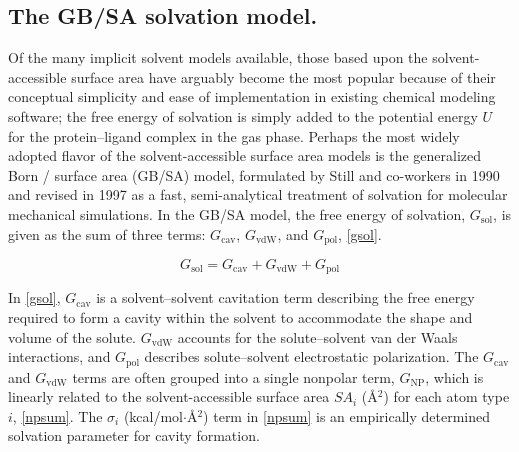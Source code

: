 \documentclass[12pt]{report}
\begin{document}

\subsection{The GB/SA solvation model.}
 
Of the many implicit solvent models available, those based upon the solvent-accessible surface area have arguably become the most popular because of their conceptual simplicity and ease of implementation in existing chemical modeling software; the free energy of solvation is simply added to the potential energy $U$ for the protein--ligand complex in the gas phase. Perhaps the most widely adopted flavor of the solvent-accessible surface area models is the generalized Born / surface area (GB/SA) model, formulated by Still and co-workers\cite{still} in 1990 and revised\cite{qiu} in 1997 as a fast, semi-analytical treatment of solvation for molecular mechanical simulations. In the GB/SA model, the free energy of solvation, $G_{\textrm{sol}}$, is given as the sum of three terms: $G_{\textrm{cav}}$, $G_{\textrm{vdW}}$, and $G_{\textrm{pol}}$, \cref{gsol}.

\vspace*{-0.4cm}
\begin{equation}
\label{gsol}
G_{\textrm{sol}} = G_{\textrm{cav}} + G_{\textrm{vdW}} + G_{\textrm{pol}}
\end{equation}
\vspace*{-0.8cm}

In \cref{gsol}, $G_{\textrm{cav}}$ is a solvent--solvent cavitation term describing the free energy required to form a cavity within the solvent to accommodate the shape and volume of the solute. $G_{\textrm{vdW}}$ accounts for the solute--solvent van der Waals interactions, and $G_{\textrm{pol}}$ describes solute--solvent electrostatic polarization. The $G_{\textrm{cav}}$ and $G_{\textrm{vdW}}$ terms are often grouped into a single nonpolar term, $G_{\textrm{NP}}$, which is linearly related \cite{hermann} to the solvent-accessible surface area $SA_{i}$ (\AA$^{2}$) for each atom type $i$, \cref{npsum}. The $\sigma_{i}$ (kcal/mol$\cdot$\AA$^{2}$) term in \cref{npsum} is an empirically determined solvation parameter for cavity formation.
\end{document}
